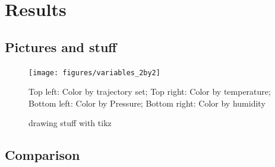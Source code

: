 \chapter{Results}

\section{Pictures and stuff}
\begin{figure}
\centering \texttt{[image: figures/variables\_2by2]}
\caption{Top left: Color by trajectory set; Top right: Color by temperature; Bottom left: Color by Pressure; Bottom right: Color by humidity}
\label{fig:results1}
\end{figure}
\begin{figure}
\centering
{}
\caption{drawing stuff with tikz}
\end{figure}


\section{Comparison}

